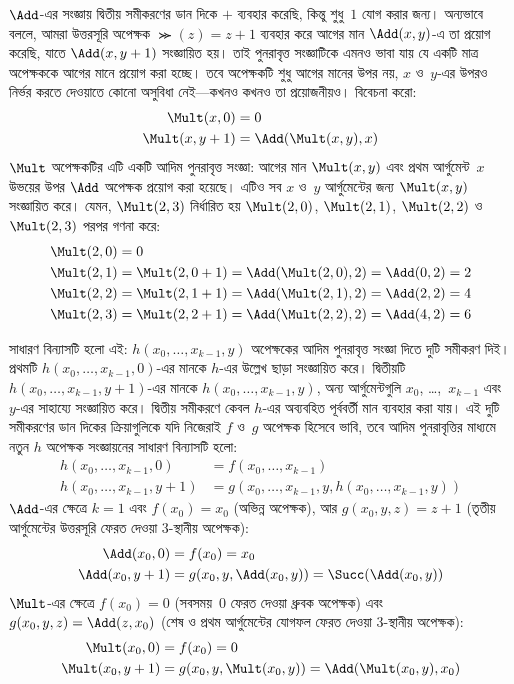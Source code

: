 \documentclass[../../../include/open-logic-section]{subfiles}
\begin{document}
$\Add$-এর সংজ্ঞায় দ্বিতীয় সমীকরণের ডান দিকে $+$ ব্যবহার করেছি, কিন্তু
শুধু~$1$ যোগ করার জন্য। অন্যভাবে বললে, আমরা উত্তরসূরি অপেক্ষক
$\Succ(z)=z+1$ ব্যবহার করে আগের মান $\Add(x,y)$-এ তা প্রয়োগ করেছি,
যাতে $\Add(x,y+1)$ সংজ্ঞায়িত হয়। তাই পুনরাবৃত্ত সংজ্ঞাটিকে এমনও
ভাবা যায় যে একটি মাত্র অপেক্ষককে আগের মানে প্রয়োগ করা হচ্ছে। তবে
অপেক্ষকটি শুধু আগের মানের উপর নয়, $x$ ও~$y$-এর উপরও নির্ভর করতে
দেওয়াতে কোনো অসুবিধা নেই—কখনও কখনও তা প্রয়োজনীয়ও। বিবেচনা করো:
\begin{align*}
  \Mult(x,0) & =  0 \\
  \Mult(x,y+1) & =  \Add(\Mult(x,y),x)
\end{align*}
$\Mult$ অপেক্ষকটির এটি একটি আদিম পুনরাবৃত্ত সংজ্ঞা: আগের মান
$\Mult(x,y)$ এবং প্রথম আর্গুমেন্ট~$x$ উভয়ের উপর $\Add$ অপেক্ষক
প্রয়োগ করা হয়েছে। এটিও সব $x$ ও~$y$ আর্গুমেন্টের জন্য $\Mult(x,y)$
সংজ্ঞায়িত করে। যেমন, $\Mult(2,3)$ নির্ধারিত হয়
$\Mult(2,0)$, $\Mult(2,1)$, $\Mult(2,2)$ ও~$\Mult(2,3)$ পরপর গণনা করে:
\begin{align*}
  \Mult(2,0) & = 0\\
  \Mult(2,1) & = \Mult(2,0+1) =
  \Add(\Mult(2,0), 2) = \Add(0, 2) = 2\\
  \Mult(2,2) & = \Mult(2,1+1) =
  \Add(\Mult(2,1), 2) = \Add(2, 2) = 4\\
  \Mult(2,3) & = \Mult(2,2+1) =
  \Add(\Mult(2,2), 2) = \Add(4, 2) = 6
\end{align*}

সাধারণ বিন্যাসটি হলো এই: $h(x_0,\dots,x_{k-1},y)$ অপেক্ষকের আদিম
পুনরাবৃত্ত সংজ্ঞা দিতে দুটি সমীকরণ দিই। প্রথমটি $h(x_0,\dots,x_{k-1},0)$-এর
মানকে $h$-এর উল্লেখ ছাড়া সংজ্ঞায়িত করে। দ্বিতীয়টি
$h(x_0,\dots,x_{k-1},y+1)$-এর মানকে $h(x_0,\dots,x_{k-1},y)$,
অন্য আর্গুমেন্টগুলি $x_0$, \dots,~$x_{k-1}$ এবং~$y$-এর সাহায্যে সংজ্ঞায়িত
করে। দ্বিতীয় সমীকরণে কেবল $h$-এর অব্যবহিত পূর্ববর্তী মান ব্যবহার করা
যায়। এই দুটি সমীকরণের ডান দিকের ক্রিয়াগুলিকে যদি নিজেরাই $f$ ও~$g$
অপেক্ষক হিসেবে ভাবি, তবে আদিম পুনরাবৃত্তির মাধ্যমে নতুন $h$ অপেক্ষক
সংজ্ঞায়নের সাধারণ বিন্যাসটি হলো:
\begin{align*}
  h(x_0, \dots, x_{k-1}, 0) & = f(x_0, \dots, x_{k-1})\\
  h(x_0, \dots, x_{k-1}, y+1) & =
  g(x_0, \dots, x_{k-1}, y, h(x_0, \dots, x_{k-1}, y))
\end{align*}
$\Add$-এর ক্ষেত্রে $k=1$ এবং $f(x_0)=x_0$ (অভিন্ন অপেক্ষক), আর
$g(x_0,y,z)=z+1$ (তৃতীয় আর্গুমেন্টের উত্তরসূরি ফেরত দেওয়া
$3$-স্থানীয় অপেক্ষক):
\begin{align*}
  \Add(x_0, 0) & = f(x_0) = x_0\\
  \Add(x_0, y+1) & = g(x_0, y, \Add(x_0, y)) =
  \Succ(\Add(x_0, y))
\end{align*}
$\Mult$-এর ক্ষেত্রে $f(x_0)=0$ (সবসময়~$0$ ফেরত দেওয়া ধ্রুবক
অপেক্ষক) এবং $g(x_0,y,z)=\Add(z,x_0)$ (শেষ ও প্রথম আর্গুমেন্টের যোগফল
ফেরত দেওয়া $3$-স্থানীয় অপেক্ষক):
\begin{align*}
  \Mult(x_0,0) & =  f(x_0) = 0 \\
  \Mult(x_0,y+1) & =  g(x_0, y, \Mult(x_0,y)) =
  \Add(\Mult(x_0,y), x_0)
\end{align*}
\end{document}
